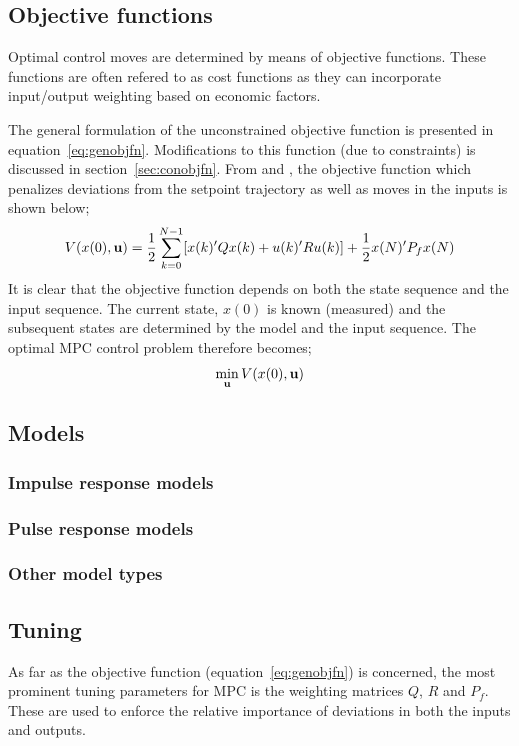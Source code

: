 \subsection{Objective functions}
Optimal control moves are determined by means of objective functions. These 
functions are often refered to as cost functions \citep[41]{maciejowskimpc} as
they can incorporate input/output weighting based on economic factors.

The general formulation of the unconstrained objective function is presented in
equation~\ref{eq:genobjfn}. Modifications to this function (due to constraints)
is discussed in section~\ref{sec:conobjfn}. From \citet[17]{rawlings} and
\citet[41]{maciejowskimpc}, the objective function which penalizes deviations
from the setpoint trajectory as well as moves in the inputs is shown below;
\begin{equation}
  \label{eq:genobjfn}
  V(x(0),{\bf u})=\frac{1}{2}\sum^{N-1}_{k=0}[x(k)'Qx(k)+u(k)'Ru(k)]
  + \frac{1}{2}x(N)'P_fx(N)
\end{equation}
It is clear that the objective function depends on both the state sequence and
the input sequence. The current state, $x(0)$ is known (measured) and the 
subsequent states are determined by the model and the input sequence. The
optimal MPC control problem therefore becomes;
\begin{equation}
  \label{eq:opctrlprob}
  \min_{\bf u} V(x(0),{\bf u})
\end{equation}
\subsection{Models}
\subsubsection{Impulse response models}
\subsubsection{Pulse response models}
\subsubsection{Other model types}
\subsection{Tuning}
As far as the objective function (equation~\ref{eq:genobjfn}) is concerned, the
most prominent tuning parameters for MPC is the weighting matrices $Q$, $R$ and
$P_f$. These are used to enforce the relative importance of deviations in both
the inputs and outputs.

